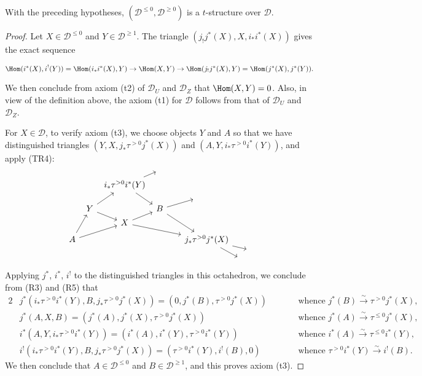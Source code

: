 \begin{theorem}\label{triangle cat recollement theorem}
With the preceding hypotheses, $(\mathcal{D}^{\leq 0},\mathcal{D}^{\geq 0})$ is a $t$-structure over $\mathcal{D}$.
\end{theorem}
\begin{proof}
Let $X\in\mathcal{D}^{\leq 0}$ and $Y\in\mathcal{D}^{\geq 1}$. The triangle $(j_!j^*(X),X,i_*i^*(X))$ gives the exact sequence
\begin{small}
\[\Hom(i^*(X),i^!(Y))=\Hom(i_*i^*(X),Y)\to \Hom(X,Y)\to\Hom(j_!j^*(X),Y)=\Hom(j^*(X),j^*(Y)).\]
\end{small}
We then conclude from axiom (t2) of $\mathcal{D}_U$ and $\mathcal{D}_Z$ that $\Hom(X,Y)=0$. Also, in view of the definition above, the axiom (t1) for $\mathcal{D}$ follows from that of $\mathcal{D}_U$ and $\mathcal{D}_Z$.\par
For $X\in\mathcal{D}$, to verify axiom (t3), we choose objects $Y$ and $A$ so that we have distinguished triangles $(Y,X,j_*\tau^{>0}j^*(X))$ and $(A,Y,i_*\tau^{>0}i^*(Y))$, and apply (TR4):
\begin{equation*}
\begin{tikzcd}[row sep=2pt,column sep=4pt]
&&&{}&\\
&&i_*\tau^{>0}i^*(Y)\ar[ru]\ar[rdd]&&\\
&&&{}&{}&{\hspace*{8mm}}\\
&Y\ar[rd]\ar[ruu]&&B\ar[rru]\ar[rrddd]\\
&&X\ar[ru]\ar[rrrdd]&&\\
&&&&\\
A\ar[ruuu]\ar[rruu]&&&&&j_*\tau^{>0}j^*(X)\ar[rdd]\ar[rrd]\\
&&&&&&&{}\\
&&&&&&{}&
\end{tikzcd}
\end{equation*}
Applying $j^*$, $i^*$, $i^!$ to the distinguished triangles in this octahedron, we conclude from (R3) and (R5) that
\begin{alignat*}{2}
&j^*(i_*\tau^{>0}i^*(Y),B,j_*\tau^{>0}j^*(X))=(0,j^*(B),\tau^{>0}j^*(X))&\quad\quad&\text{whence $j^*(B)\stackrel{\sim}{\to} \tau^{>0}j^*(X)$},\\
&j^*(A,X,B)=(j^*(A),j^*(X),\tau^{>0}j^*(X))&\quad\quad&\text{whence $j^*(A)\stackrel{\sim}{\to} \tau^{\leq 0}j^*(X)$},\\
&i^*(A,Y,i_*\tau^{>0}i^*(Y))=(i^*(A),i^*(Y),\tau^{>0}i^*(Y))&\quad\quad&\text{whence $i^*(A)\stackrel{\sim}{\to} \tau^{\leq 0}i^*(Y)$},\\
&i^!(i_*\tau^{>0}i^*(Y),B,j_*\tau^{>0}j^*(X))=(\tau^{>0}i^*(Y),i^!(B),0)&\quad\quad&\text{whence $\tau^{>0}i^*(Y)\stackrel{\sim}{\to} i^!(B)$}.
\end{alignat*}
We then conclude that $A\in\mathcal{D}^{\leq 0}$ and $B\in\mathcal{D}^{\geq 1}$, and this proves axiom (t3).
\end{proof}

